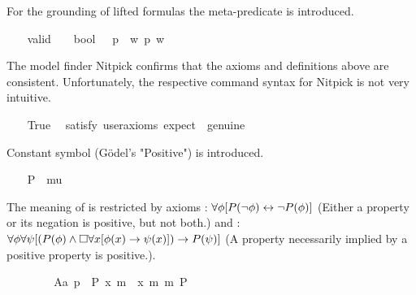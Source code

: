 \begin{isabellebody}
\begin{isamarkuptext}%
For the grounding of lifted formulas the meta-predicate  is introduced.%
\end{isamarkuptext}%
\isamarkuptrue%
\ \ \isamarkupfalse%
\ valid\ {\isacharcolon}{\isacharcolon}\ {\isachardoublequoteopen}{\isasymsigma}\ {\isasymRightarrow}\ bool{\isachardoublequoteclose}\ {\isacharparenleft}{\isachardoublequoteopen}{\isacharbrackleft}{\isacharunderscore}{\isacharbrackright}{\isachardoublequoteclose}{\isacharparenright}\ \ {\isachardoublequoteopen}{\isacharbrackleft}p{\isacharbrackright}\ {\isasymequiv}\ {\isasymforall}w{\isachardot}\ p\ w{\isachardoublequoteclose}%
\begin{isamarkuptext}%
The model finder Nitpick confirms that the axioms and definitions above are consistent. 
Unfortunately, the respective command syntax for Nitpick is not very intuitive.%
\end{isamarkuptext}%
\isamarkuptrue%
\ \ \isamarkupfalse%
\ True\ \isamarkupfalse%
\ {\isacharbrackleft}satisfy{\isacharcomma}\ user{\isacharunderscore}axioms{\isacharcomma}\ expect\ {\isacharequal}\ genuine{\isacharbrackright}%
\isadelimproof
\ %
\endisadelimproof
%
\isatagproof
{}\isamarkupfalse%
%
\endisatagproof
{\isafoldproof}%
%
\isadelimproof
%
\endisadelimproof
%
\begin{isamarkuptext}%
Constant symbol  (G\"odel's "Positive") is introduced.%
\end{isamarkuptext}%
\isamarkuptrue%
\ \ \isamarkupfalse%
\ P\ {\isacharcolon}{\isacharcolon}\ {\isachardoublequoteopen}{\isacharparenleft}mu\ {\isasymRightarrow}\ {\isasymsigma}{\isacharparenright}\ {\isasymRightarrow}\ {\isasymsigma}{\isachardoublequoteclose}%
\begin{isamarkuptext}%
The meaning of  is restricted by axioms : $\forall \phi 
[P(\neg \phi) \leftrightarrow \neg P(\phi)]$ (Either a property or its negation is positive, but not both.) 
and : $\forall \phi \forall \psi [(P(\phi) \wedge \Box \forall x [\phi(x) \rightarrow \psi(x)]) 
\rightarrow P(\psi)]$ (A property necessarily implied by a positive property is positive.).%
\end{isamarkuptext}%
\isamarkuptrue%
\ \ \isamarkupfalse%
\ \isanewline
\ \ \ \ A{}a{\isacharcolon}\ {\isachardoublequoteopen}{\isacharbrackleft}{\isasymforall}p\ {\isacharparenleft}{\isasymlambda}{\isasymPhi}{\isachardot}\ P\ {\isacharparenleft}{\isasymlambda}x{\isachardot}\ m{\isasymnot}\ {\isacharparenleft}{\isasymPhi}\ x{\isacharparenright}{\isacharparenright}\ m{\isasymRightarrow}\ m{\isasymnot}\ {\isacharparenleft}P\ {\isasymPhi}{\isacharparenright}{\isacharparenright}{\isacharbrackright}{\isachardoublequoteclose}\ \isanewline

\end{isabellebody}
